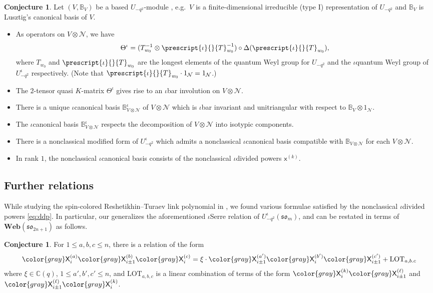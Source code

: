 \documentclass[10pt]{amsart}
\newcommand{\gray}[1]{{\color{gray}#1}}
\numberwithin{equation}{section}
\theoremstyle{definition}
\newtheorem{conj}[thm]{Conjecture}
\def\C{{\mathbb C}}
\newcommand{\son}[1][2n+1]{\mathfrak{so}_{#1}}
\newcommand{\som}[1][m]{\mathfrak{so}_{#1}}
\newcommand{\Web}{\mathbf{Web}}
\newcommand{\iqUsom}[1][m]{{U}^{\iota}_{-q^2}(\som[#1])}
\newcommand{\iQW}{\prescript{\iota}{}{T}}
\newcommand{\xx}{\gray{\mathsf{X}}}
\newcommand{\xxb}{\mathsf{x}}
\newcommand{\nctriv}{\mathcal{N}}
\begin{document}
\begin{conj}
Let $(V, \mathbb{B}_V)$ be a based $U_{-q^2}$-module \cite[Chapter 27]{Lus4}, 
e.g.~$V$ is a finite-dimensional irreducible (type I) representation of $U_{-q^2}$ 
and $\mathbb{B}_V$ is Lusztig's canonical basis of $V$.
\begin{itemize}
\item As operators on $V\otimes \nctriv$, we have 
\[
\Theta^{\iota} = (T_{w_0}^{-1}\otimes \iQW_{w_0}^{-1})\circ \Delta(\iQW_{w_0}), 
\]
where $T_{w_0}$ and $\iQW_{w_0}$ are the longest elements of the quantum Weyl group for $U_{-q^2}$ 
and the $\iota$quantum Weyl group of $U_{-q^2}^{\iota}$ respectively. 
(Note that $\iQW_{w_0}\cdot 1_{\nctriv} = 1_{\nctriv}$.)
\item The $2$-tensor quasi $K$-matrix $\Theta^{\iota}$ 
gives rise to an $\iota$bar involution on $V\otimes \nctriv$. 
\item There is a unique $\iota$canonical basis $\mathbb{B}_{V\otimes \nctriv}^{\iota}$ of $V\otimes \nctriv$ 
which is $\iota$bar invariant and unitriangular with respect to $\mathbb{B}_V\otimes 1_{\nctriv}$. 
\item The $\iota$canonical basis $\mathbb{B}_{V\otimes \nctriv}^{\iota}$ respects the decomposition of $V\otimes \nctriv$ into isotypic components.
\item There is a nonclassical modified form of $U_{-q^2}^{\iota}$ 
which admits a nonclassical $\iota$canonical basis compatible with $\mathbb{B}_{V\otimes \nctriv}$ for each $V\otimes \nctriv$. 
\item In rank $1$, the nonclassical $\iota$canonical basis consists of the nonclassical $\iota$divided powers $\xxb^{(k)}$.
\end{itemize}
\end{conj}

\subsection{Further relations}
	\label{ss:furtherrelationsandapp}

While studying the spin-colored Reshetikhin--Turaev link polynomial in \cite{BER}, 
we found various formulae satisfied by the nonclassical $\iota$divided powers \eqref{eq:ddp}. 
In particular, our \cite[Conjecture 4.40]{BER} generalizes the aforementioned 
$\iota$Serre relation of $\iqUsom$,
and can be restated in terms of $\Web(\son)$ as follows. 
\begin{conj}\label{conj:divpowerrelns}
For $1\le a,b,c\le n$, there is a relation of the form
\[
\xx_i^{(a)}\xx_{i\pm 1}^{(b)}\xx_i^{(c)} = \xi\cdot \xx_{i\pm 1}^{(a')}\xx_i^{(b')}\xx_{i\pm 1}^{(c')} 
	+ \mathrm{LOT}_{a,b.c}
\]
where $\xi\in \C(q)$, $1\le a',b',c'\le n$, 
and $\mathrm{LOT}_{a,b,c}$ is a linear combination of terms of the form 
$\xx_i^{(k)}\xx_{i\pm 1}^{(\ell)}$ and $\xx_{i \pm 1}^{(\ell)}\xx_i^{(k)}$.
\end{conj}
\end{document}

